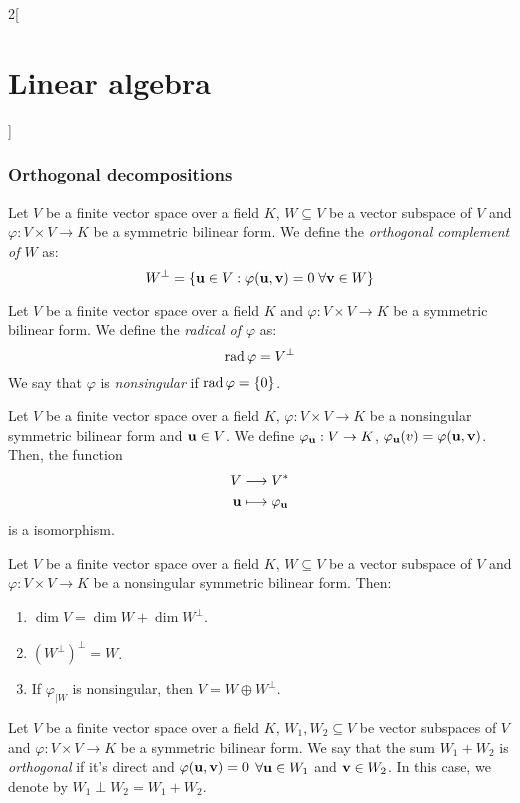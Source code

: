 \documentclass[../../../main.tex]{subfiles}
\begin{document}
\begin{multicols}{2}[\section{Linear algebra}]
  \subsubsection*{Orthogonal decompositions}
  \begin{definition}\label{ALG-singular}
    Let $V$ be a finite vector space over a field $K$, $W\subseteq V$ be a vector subspace of $V$ and $\varphi:V\times V\rightarrow K$ be a symmetric bilinear form. We define the \textit{orthogonal complement of $W$} as: $$W^\perp=\{\vb{u}\in V:\varphi(\vb{u},\vb{v})=0\;\forall\vb{v}\in W\}$$
  \end{definition}
  \begin{definition}
    Let $V$ be a finite vector space over a field $K$ and $\varphi:V\times V\rightarrow K$ be a symmetric bilinear form. We define the \textit{radical of $\varphi$} as: $$\operatorname{rad}\varphi=V^\perp$$ We say that $\varphi$ is \textit{nonsingular} if $\operatorname{rad}\varphi=\{0\}$.
  \end{definition}
  \begin{definition}
    Let $V$ be a finite vector space over a field $K$, $\varphi:V\times V\rightarrow K$ be a nonsingular symmetric bilinear form and $\vb{u}\in V$. We define $\varphi_{\vb{u}}:V\rightarrow K$, $\varphi_{\vb{u}}(v)=\varphi(\vb{u},\vb{v})$. Then, the function
    \begin{align*}
      V             & \longrightarrow V^*                \\
      \vb{u} & \longmapsto\varphi_{\vb{u}}
    \end{align*} is a isomorphism.
  \end{definition}
  \begin{definition}
    Let $V$ be a finite vector space over a field $K$, $W\subseteq V$ be a vector subspace of $V$ and $\varphi:V\times V\rightarrow K$ be a nonsingular symmetric bilinear form. Then:
    \begin{enumerate}
      \item $\dim V=\dim W+\dim W^\perp$.
      \item ${(W^\perp)}^\perp=W$.
      \item If $\varphi_{|W}$ is nonsingular, then $V=W\oplus W^\perp$.
    \end{enumerate}
  \end{definition}
  \begin{definition}
    Let $V$ be a finite vector space over a field $K$, $W_1,W_2\subseteq V$ be vector subspaces of $V$ and $\varphi:V\times V\rightarrow K$ be a symmetric bilinear form. We say that the sum $W_1+W_2$ is \textit{orthogonal} if it's direct and $\varphi(\vb{u},\vb{v})=0$ $\forall \vb{u}\in W_1$ and $\vb{v}\in W_2$. In this case, we denote by $W_1\perp W_2=W_1+W_2$.

\end{definition}
\end{multicols}
\end{document}
